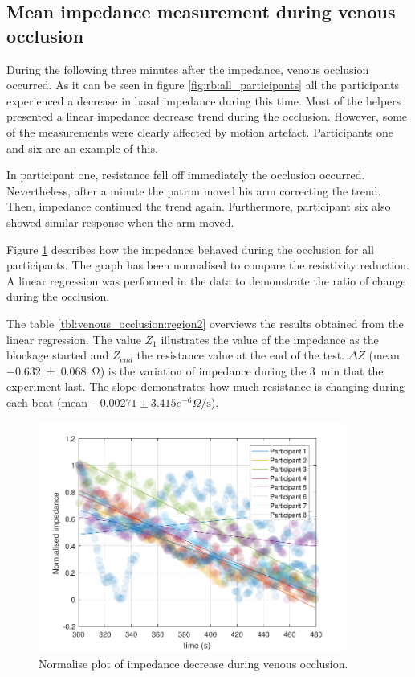 \subsection{Mean impedance measurement during venous occlusion}
\label{section5.2.2}
During the following three minutes after the impedance, venous occlusion occurred. As it can be seen in figure \ref{fig:rb:all_participants} all the participants experienced a decrease in basal impedance during this time. Most of the helpers presented a linear impedance decrease trend during the occlusion. However, some of the measurements were clearly affected by motion artefact. Participants one and six are an example of this. 

In participant one, resistance fell off immediately the occlusion occurred. Nevertheless, after a minute the patron moved his arm correcting the trend. Then, impedance continued the trend again. Furthermore,  participant six also showed similar response when the arm moved. 

Figure \ref{fig:normalise:venous_occlusion} describes how the impedance behaved during the occlusion for all participants. The graph has been normalised to compare the resistivity reduction.  A linear regression was performed in the data to demonstrate the ratio of change during the occlusion.  

The table \ref{tbl:venous_occlusion:region2} overviews the results obtained from the linear regression. The value $Z_1$ illustrates the value of the impedance as the blockage started and $Z_{end}$ the resistance value at the end of the test.  $\Delta Z$ (mean \SI{-0.632(0068)}{\ohm}) is the variation of impedance during the \SI{3}{\minute} that the experiment last.  The slope demonstrates how much resistance is changing during each beat  (mean $-0.00271\pm3.415e^{-6}\Omega\textrm{/s}$). 

\begin{figure}
	\centering
	\includegraphics[width=0.9\textwidth,height=0.9\textheight,keepaspectratio]{figure3}    
	\caption{Normalise plot of impedance decrease during venous occlusion.}
	\label{fig:normalise:venous_occlusion}
\end{figure}

